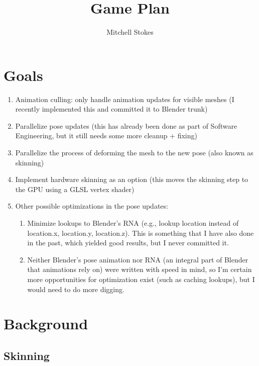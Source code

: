 \documentclass[]{article}
\title{Game Plan}
\author{Mitchell Stokes}
\begin{document}
\maketitle

\section{Goals}

\begin{enumerate}
 \item Animation culling: only handle animation updates for visible meshes (I recently implemented this and committed it to Blender trunk)
 \item Parallelize pose updates (this has already been done as part of Software Engineering, but it still needs some more cleanup + fixing)
 \item Parallelize the process of deforming the mesh to the new pose (also known as skinning)
 \item Implement hardware skinning as an option (this moves the skinning step to the GPU using a GLSL vertex shader)
 \item Other possible optimizations in the pose updates:
    \begin{enumerate}
      \item Minimize lookups to Blender's RNA (e.g., lookup location instead of location.x, location.y, location.z). This is something that I have also done in the past, which yielded good results, but I never committed it.
      \item Neither Blender's pose animation nor RNA (an integral part of Blender that animations rely on) were written with speed in mind, so I'm certain more opportunities for optimization exist (such as caching lookups), but I would need to do more digging.
    \end{enumerate}
\end{enumerate}

\section{Background}

\subsection{Skinning}
\end{document}
